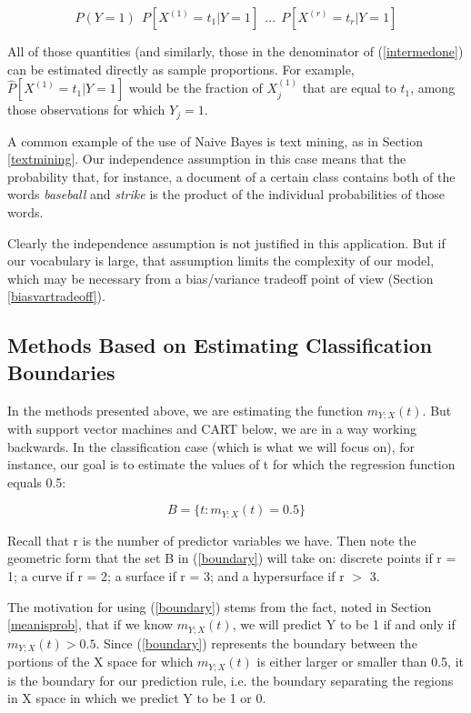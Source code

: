 \begin{equation}
P(Y = 1) ~~ P[X^{(1)}=t_1|Y=1]~~ ...~~ P[X^{(r)}=t_r|Y=1]
\end{equation}

All of those quantities (and similarly, those in the denominator of
(\ref{intermedone}) can be estimated directly as sample proportions.
For example, $\widehat{P}[X^{(1)}=t_1|Y=1]$ would be the fraction of
$X_j^{(1)}$ that are equal to $t_1$, among those observations for which
$Y_j = 1$.

A common example of the use of Naive Bayes is text mining, as in Section
\ref{textmining}.  Our independence assumption in this case means that
the probability that, for instance, a document of a certain class
contains both of the words {\it baseball} and {\it strike} is the
product of the individual probabilities of those words.

Clearly the independence assumption is not justified in this
application.  But if our vocabulary is large, that assumption limits the
complexity of our model, which may be necessary from a bias/variance
tradeoff point of view (Section \ref{biasvartradeoff}).  

\subsection{Methods Based on Estimating Classification Boundaries}

In the methods presented above, we are estimating the function
$m_{Y;X}(t)$.  But with support vector machines and CART below, we are
in a way working backwards.  In the classification case (which is what
we will focus on), for instance, our goal is to estimate the values of t
for which the regression function equals 0.5:

\begin{equation}
\label{boundary}
B = \{t: m_{Y;X}(t) = 0.5\}
\end{equation}

Recall that r is the number of predictor variables we have.  Then note
the geometric form that the set B in (\ref{boundary}) will take on:
discrete points if r = 1; a curve if r = 2; a surface if r = 3; and a
hypersurface if r $>$ 3.

The motivation for using (\ref{boundary}) stems from the fact, noted in
Section \ref{meanisprob}, that if we know $m_{Y;X}(t)$, we will predict
Y to be 1 if and only if $m_{Y;X}(t) > 0.5$.  Since (\ref{boundary})
represents the boundary between the portions of the X space for which
$m_{Y;X}(t)$ is either larger or smaller than 0.5, it is the boundary
for our prediction rule, i.e. the boundary separating the regions in X
space in which we predict Y to be 1 or 0.


